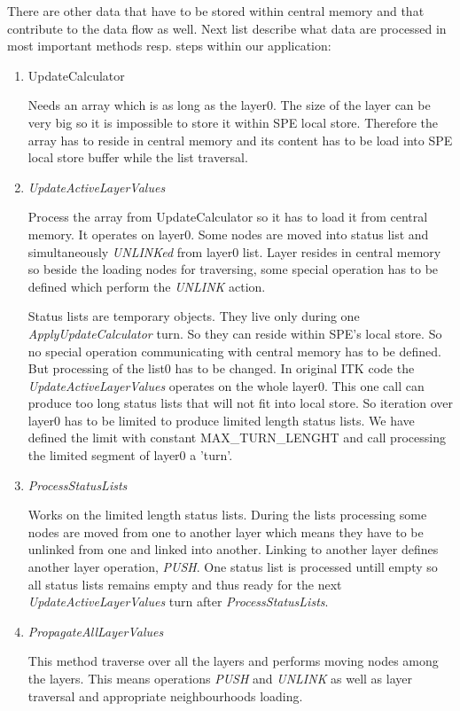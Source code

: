 \par
There are other data that have to be stored within central memory and that contribute to the data flow as well.
Next list describe what data are processed in most important methods resp. steps within our application:
\begin{enumerate}
\item UpdateCalculator
\par
Needs an array which is as long as the layer0.
The size of the layer can be very big so it is impossible to store it within SPE local store.
Therefore the array has to reside in central memory and its content has to be load into SPE local store buffer while the list traversal.

\item \emph{UpdateActiveLayerValues}
\par
Process the array from UpdateCalculator so it has to load it from central memory.
It operates on layer0.
Some nodes are moved into status list and simultaneously \emph{UNLINKed} from layer0 list.
Layer resides in central memory so beside the loading nodes for traversing, some special operation has to be defined which perform the \emph{UNLINK} action.
\par
Status lists are temporary objects. They live only during one \mbox{\emph{ApplyUpdateCalculator}} turn.
So they can reside within SPE's local store.
So no special operation communicating with central memory has to be defined.
But processing of the list0 has to be changed.
In original ITK code the \mbox{\emph{UpdateActiveLayerValues}} operates on the whole layer0.
This one call can produce too long status lists that will not fit into local store.
So iteration over layer0 has to be limited to produce limited length status lists.
We have defined the limit with constant \mbox{MAX\_TURN\_LENGHT} and call processing the limited segment of layer0 a 'turn'.

\item \emph{ProcessStatusLists}
\par
Works on the limited length status lists.
During the lists processing some nodes are moved from one to another layer which means they have to be unlinked from one and linked into another.
Linking to another layer defines another layer operation, \emph{PUSH}.
One status list is processed untill empty so all status lists remains empty and thus ready for the next \emph{UpdateActiveLayerValues} turn after \emph{ProcessStatusLists}.

\item \emph{PropagateAllLayerValues}
\par
This method traverse over all the layers and performs moving nodes among the layers.
This means operations \emph{PUSH} and \emph{UNLINK} as well as layer traversal and appropriate neighbourhoods loading.
\end{enumerate}

